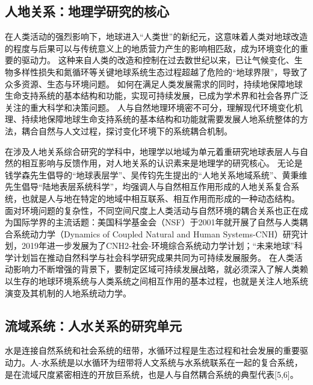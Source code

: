 \subsection{人地关系：地理学研究的核心}

在人类活动的强烈影响下，地球进入“人类世”的新纪元，这意味着人类对地球改造的程度与后果可以与传统意义上的地质营力产生的影响相匹敌，成为环境变化的重要的驱动力\cite{lenton2019, lewis2015, lewis2018}。
这种来自人类的改造和控制在过去数世纪以来，已让气候变化、生物多样性损失和氮循环等关键地球系统生态过程超越了危险的“地球界限”，导致了众多资源、生态与环境问题\cite{steffen2015}。
如何在满足人类发展需求的同时，持续地保障地球生命支持系统的基本结构和功能，实现可持续发展，已成为学术界和社会各界广泛关注的重大科学和决策问题\cite{wu2014}。
人与自然地理环境密不可分，理解现代环境变化机理、持续地保障地球生命支持系统的基本结构和功能就需要发展人地系统整体的方法，耦合自然与人文过程，探讨变化环境下的系统耦合机制\cite{fu2015}。

在涉及人地关系综合研究的学科中，地理学以地域为单元着重研究地球表层人与自然的相互影响与反馈作用，对人地关系的认识素来是地理学的研究核心\cite{wu1991}。
无论是钱学森先生倡导的“地球表层学”、吴传钧先生提出的“人地关系地域系统”、黄秉维先生倡导“陆地表层系统科学”，均强调人与自然相互作用形成的人地关系复合系统，也就是人与地在特定的地域中相互联系、相互作用而形成的一种动态结构。
面对环境问题的复杂性，不同空间尺度上人类活动与自然环境的耦合关系也正在成为国际学界的主流话题\cite{fu2015}：美国科学基金会（NSF）于2001年就开展了自然与人类耦合系统动力学（Dynamics of Coupled Natural and Human Systems-CNH）研究计划，2019年进一步发展为了CNH2-社会-环境综合系统动力学计划；“未来地球”科学计划旨在推动自然科学与社会科学研究成果共同为可持续发展服务。
在人类活动影响力不断增强的背景下，要制定区域可持续发展战略，就必须深入了解人类赖以生存的地球环境系统与人类系统之间相互作用的基本过程，也就是关注人地系统演变及其机制的人地系统动力学\cite{fu2022}。

\subsection{流域系统：人水关系的研究单元}
水是连接自然系统和社会系统的纽带，水循环过程是生态过程和社会发展的重要驱动力。人-水系统是以水循环为纽带将人文系统与水系统联系在一起的复合系统，是在流域尺度紧密相连的开放巨系统，也是人与自然耦合系统的典型代表[5,6]。

